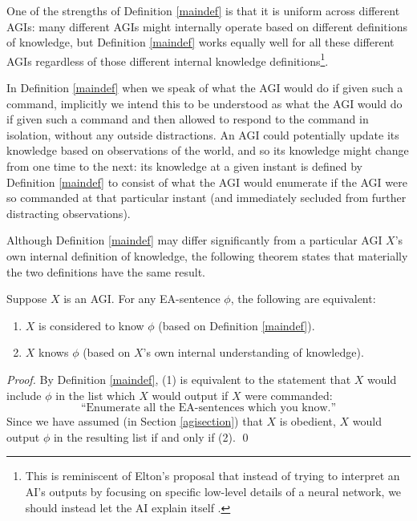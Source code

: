 \documentclass[runningheads]{llncs}
\begin{document}
One of the strengths of Definition \ref{maindef} is that it is uniform across
different AGIs: many different AGIs might internally operate based on different
definitions of knowledge, but Definition \ref{maindef} works equally well for
all these different AGIs regardless of those different internal knowledge
definitions\footnote{This is reminiscent of Elton's proposal that instead of
trying to interpret an AI's outputs by focusing on specific low-level details
of a neural network, we should instead let the AI explain itself \cite{elton}.}.

\begin{remark}
In Definition \ref{maindef} when we speak of what the AGI would do
if given such a command, implicitly we intend this to be understood as what
the AGI would do if given such a command and then allowed to respond to the
command in isolation, without any outside distractions. An AGI could potentially
update its knowledge based on observations of the world, and so its knowledge
might change from one time to the next: its knowledge at a given instant is defined
by Definition \ref{maindef} to consist of what the AGI would enumerate if the
AGI were so commanded at that particular instant (and immediately secluded from
further distracting observations).
\end{remark}

Although Definition \ref{maindef} may differ significantly from a particular AGI
$X$'s own internal definition of knowledge, the following theorem states that
materially the two definitions have the same result.

\begin{theorem}
\label{sentenceequivalence}
  Suppose $X$ is an AGI. For any EA-sentence $\phi$, the following
  are equivalent:
  \begin{enumerate}
    \item $X$ is
    considered to know $\phi$ (based on Definition \ref{maindef}).
    \item
    $X$ knows $\phi$ (based on $X$'s own internal understanding of
    knowledge).
  \end{enumerate}
\end{theorem}

\begin{proof}
  By Definition \ref{maindef}, (1) is equivalent to the statement that $X$ would
  include $\phi$ in the list which $X$ would output if $X$ were commanded:
  \[
  \text{``Enumerate all the EA-sentences which you know.''}
  \]
  Since we have assumed (in Section \ref{agisection}) that $X$ is obedient,
  $X$ would output
  $\phi$ in the resulting list if and only if (2).
  \qed
\end{proof}
\end{document}
